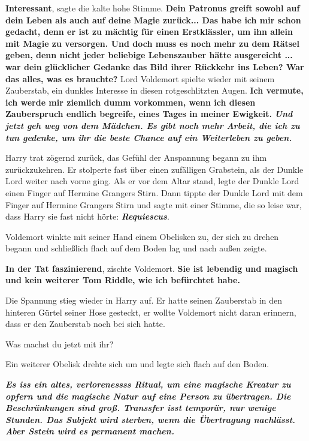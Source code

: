 \glqq{}\textbf{Interessant}\grqq{}, sagte die kalte hohe Stimme. \glqq{}
\textbf{Dein Patronus greift sowohl auf dein Leben als auch auf deine Magie
zurück... Das habe ich mir schon gedacht, denn er ist zu mächtig für einen
Erstklässler, um ihn allein mit Magie zu versorgen. Und doch muss es noch mehr
zu dem Rätsel geben, denn nicht jeder beliebige Lebenszauber hätte ausgereicht
... war dein glücklicher Gedanke das Bild ihrer Rückkehr ins Leben? War das
alles, was es brauchte?}\grqq{} Lord Voldemort spielte wieder mit seinem Zauberstab,
ein dunkles Interesse in diesen rotgeschlitzten Augen. \glqq{}\textbf{Ich
vermute, ich werde mir ziemlich dumm vorkommen, wenn ich diesen Zauberspruch
endlich begreife, eines Tages in meiner Ewigkeit.}
\textbf{}
\textbf{\emph{Und jetzt geh weg von dem Mädchen. Es gibt noch mehr Arbeit, die
ich zu tun gedenke, um ihr die beste Chance auf ein Weiterleben zu geben.}}\grqq{}

Harry trat zögernd zurück, das Gefühl der Anspannung begann zu ihm
zurückzukehren. Er stolperte fast über einen zufälligen Grabstein, als der
Dunkle Lord weiter nach vorne ging. Als er vor dem Altar stand, legte der Dunkle
Lord einen Finger auf Hermine Grangers Stirn. Dann tippte der Dunkle Lord mit
dem Finger auf Hermine Grangers Stirn und sagte mit einer Stimme, die so leise
war, dass Harry sie fast nicht hörte: \glqq{}\textbf{\emph{Requiescus}}.\grqq{}

Voldemort winkte mit seiner Hand einem Obelisken zu, der sich zu drehen begann
und schließlich flach auf dem Boden lag und nach außen zeigte.

\glqq{}\textbf{In der Tat faszinierend}\grqq{}, zischte Voldemort. \glqq{}
\textbf{Sie ist lebendig und magisch und kein weiterer Tom Riddle, wie ich
befürchtet habe.}\grqq{}

Die Spannung stieg wieder in Harry auf. Er hatte seinen Zauberstab in den
hinteren Gürtel seiner Hose gesteckt, er wollte Voldemort nicht daran erinnern,
dass er den Zauberstab noch bei sich hatte.

\glqq{}Was machst du jetzt mit ihr?\grqq{}

Ein weiterer Obelisk drehte sich um und legte sich flach auf den Boden.

\glqq{}\textbf{\emph{Es iss ein altes, verlorenessss Ritual, um eine magische
Kreatur zu opfern und die magische Natur auf eine Person zu übertragen. Die
Beschränkungen sind groß. Transsfer isst temporär, nur wenige Stunden. Das
Subjekt wird sterben, wenn die Übertragung nachlässt. Aber Sstein wird es
permanent machen.}}\grqq{}

